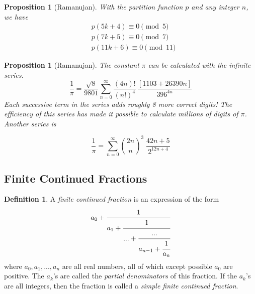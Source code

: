 \documentclass{article}
\newtheorem{proposition}[theorem]{Proposition}
\theoremstyle{remark}
\theoremstyle{definition}
\newtheorem{definition}{Definition}[section]
\begin{document}
\begin{proposition}[Ramanujan]
With the partition function $p$ and any integer $n$, we have
\begin{align}
    & p(5k+4) \equiv 0 \pmod{5} \\
    & p(7k+5) \equiv 0 \pmod{7} \\
    & p(11k+6) \equiv 0 \pmod{11}
\end{align}
\end{proposition}


\begin{proposition}[Ramanujan]
The constant $\pi$ can be calculated with the infinite series.
\[\frac{1}{\pi} = \frac{\sqrt{8}}{9801} \sum_{n=0}^\infty \frac{(4n)!}{(n!)^4} \, \frac{[1103 + 26390n]}{396^{4n}}\]
Each successive term in the series adds roughly 8 more correct digits! The efficiency of this series has made it possible to calculate millions of digits of $\pi$. Another series is 

\[\frac{1}{\pi} = \sum_{n=0}^\infty \binom{2n}{n}^3 \; \frac{42n + 5}{2^{12n+4}}\]
\end{proposition}


\subsection{Finite Continued Fractions}

\begin{definition}
A \textit{finite continued fraction} is an expression of the form 
\[a_0 + \cfrac{1}{a_1 + \cfrac{1}{... + \cfrac{...}{a_{n-1} + \cfrac{1}{a_n}}}}\]
where $a_0, a_1, ..., a_n$ are all real numbers, all of which except possible $a_0$ are positive. The $a_k$'s are called the \textit{partial denominators} of this fraction. If the $a_k$'s are all integers, then the fraction is called a \textit{simple finite continued fraction}. 
\end{definition}
\end{document}
